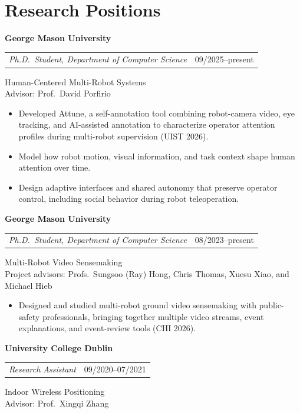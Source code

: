 \documentclass[10pt,letterpaper]{article}
\makeatletter
\newcommand{\datedline}[2]{%
  \noindent\begin{tabularx}{\linewidth}{@{}X@{\hspace{12pt}}r@{}}#1 & #2\end{tabularx}\par}
\newcommand{\position}[4]{%
  \Needspace{6\baselineskip}%
  \textbf{#1}\par
  \datedline{\textit{#2}}{#3}%
  #4\par}
\makeatother
\begin{document}
\section{Research Positions}
\position{George Mason University}{Ph.D.\ Student, Department of Computer Science}{09/2025--present}{%
  Human-Centered Multi-Robot Systems\\
  Advisor: Prof.\ David Porfirio}
\begin{itemize}
\item Developed Attune, a self-annotation tool combining robot-camera video, eye tracking, and AI-assisted annotation to characterize operator attention profiles during multi-robot supervision (UIST 2026).
\item Model how robot motion, visual information, and task context shape human attention over time.
\item Design adaptive interfaces and shared autonomy that preserve operator control, including social behavior during robot teleoperation.
\end{itemize}
\vspace{5pt}
\position{George Mason University}{Ph.D.\ Student, Department of Computer Science}{08/2023--present}{%
  Multi-Robot Video Sensemaking\\
  Project advisors: Profs.\ Sungsoo (Ray) Hong, Chris Thomas, Xuesu Xiao, and Michael Hieb}
\begin{itemize}
\item Designed and studied multi-robot ground video sensemaking with public-safety professionals, bringing together multiple video streams, event explanations, and event-review tools (CHI 2026).
\end{itemize}
\vspace{5pt}
\position{University College Dublin}{Research Assistant}{09/2020--07/2021}{%
  Indoor Wireless Positioning\\
  Advisor: Prof.\ Xingqi Zhang}
\end{document}
